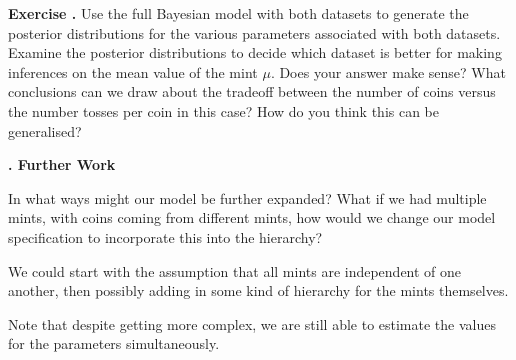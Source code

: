 \documentclass[10pt, a4paper]{article}
\newcounter{wssection}
\newcounter{wsexercise}[wssection]
\newcommand{\worksheetsection}[1]{
\vspace{10mm}
\stepcounter{wssection}
\noindent \Large \textbf{\thewssection. #1} \normalsize
\vspace{3mm}
}
\newcommand{\worksheetexercise}{
\stepcounter{wsexercise}
\vspace{5mm} \noindent \textbf{Exercise \thewssection.\thewsexercise \;}
}
\begin{document}
\worksheetexercise Use the full Bayesian model with both datasets to
generate the posterior distributions for the various parameters
associated with both datasets. Examine the posterior distributions to
decide which dataset is better for making inferences on the mean value
of the mint $\mu$. Does your answer make sense? What conclusions can
we draw about the tradeoff between the number of coins versus the
number tosses per coin in this case? How do you think this can be
generalised?


\worksheetsection{Further Work}

\noindent
In what ways might our model be further expanded? What if we had
multiple mints, with coins coming from different mints, how would we
change our model specification to incorporate this into the hierarchy?

We could start with the assumption that all mints are independent of
one another, then possibly adding in some kind of hierarchy for the
mints themselves.

Note that despite getting more complex, we are still able to estimate
the values for the parameters simultaneously.
\end{document}
